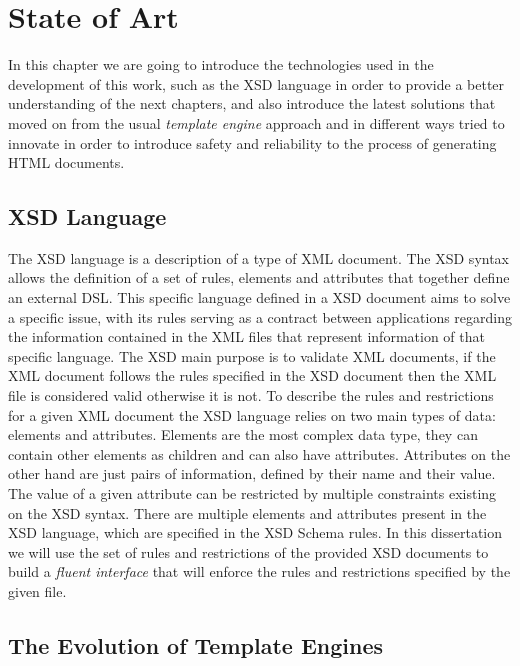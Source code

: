 \chapter{State of Art}
\label{cha:stateofart}

In this chapter we are going to introduce the technologies used in the development of this work, such as the \ac{XSD} language in order to provide a better understanding of the next chapters, and also introduce the latest solutions that moved on from the usual \textit{template engine} approach and in different ways tried to innovate in order to introduce safety and reliability to the process of generating \ac{HTML} documents. 

\section{XSD Language} %
\label{sec:xsd}

The \ac{XSD} language is a description of a type of \ac{XML} document. The \ac{XSD} syntax allows the definition of a set of rules, elements and attributes that together define an external \ac{DSL}. This specific language defined in a \ac{XSD} document aims to solve a specific issue, with its rules serving as a contract between applications regarding the information contained in the \ac{XML} files that represent information of that specific language. The \ac{XSD} main purpose is to validate \ac{XML} documents, if the \ac{XML} document follows the rules specified in the \ac{XSD} document then the \ac{XML} file is considered valid otherwise it is not. To describe the rules and restrictions for a given \ac{XML} document the \ac{XSD} language relies on two main types of data: elements and attributes. Elements are the most complex data type, they can contain other elements as children and can also have attributes. Attributes on the other hand are just pairs of information, defined by their name and their value. The value of a given attribute can be restricted by multiple constraints existing on the \ac{XSD} syntax. There are multiple elements and attributes present in the \ac{XSD} language, which are specified in the \ac{XSD} Schema rules\cite{xsdrules}. In this dissertation we will use the set of rules and restrictions of the provided \ac{XSD} documents to build a \textit{fluent interface} that will enforce the rules and restrictions specified by the given file.

\section{The Evolution of Template Engines}
\label{sec:templateenginesevolution}

